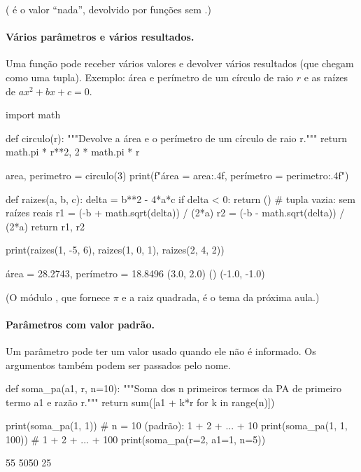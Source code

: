 ( é o valor ``nada'', devolvido por funções sem .)

\paragraph{Vários parâmetros e vários resultados.} Uma função pode receber vários valores e devolver vários
resultados (que chegam como uma tupla). Exemplo: área e perímetro de um círculo de raio $r$ e as raízes de
$ax^2+bx+c=0$.

\begin{entrada}
import math

def circulo(r):
    """Devolve a área e o perímetro de um círculo de raio r."""
    return math.pi * r**2, 2 * math.pi * r

area, perimetro = circulo(3)
print(f"área = {area:.4f}, perímetro = {perimetro:.4f}")

def raizes(a, b, c):
    delta = b**2 - 4*a*c
    if delta < 0:
        return ()                 # tupla vazia: sem raízes reais
    r1 = (-b + math.sqrt(delta)) / (2*a)
    r2 = (-b - math.sqrt(delta)) / (2*a)
    return r1, r2

print(raizes(1, -5, 6), raizes(1, 0, 1), raizes(2, 4, 2))
\end{entrada}
\begin{saida}
área = 28.2743, perímetro = 18.8496
(3.0, 2.0) () (-1.0, -1.0)
\end{saida}

(O módulo , que fornece $\pi$ e a raiz quadrada, é o tema da próxima aula.)

\paragraph{Parâmetros com valor padrão.} Um parâmetro pode ter um valor usado quando ele não é informado.
Os argumentos também podem ser passados pelo nome.

\begin{entrada}
def soma_pa(a1, r, n=10):
    """Soma dos n primeiros termos da PA de primeiro termo a1 e razão r."""
    return sum([a1 + k*r for k in range(n)])

print(soma_pa(1, 1))          # n = 10 (padrão): 1 + 2 + ... + 10
print(soma_pa(1, 1, 100))     # 1 + 2 + ... + 100
print(soma_pa(r=2, a1=1, n=5))
\end{entrada}
\begin{saida}
55
5050
25
\end{saida}

